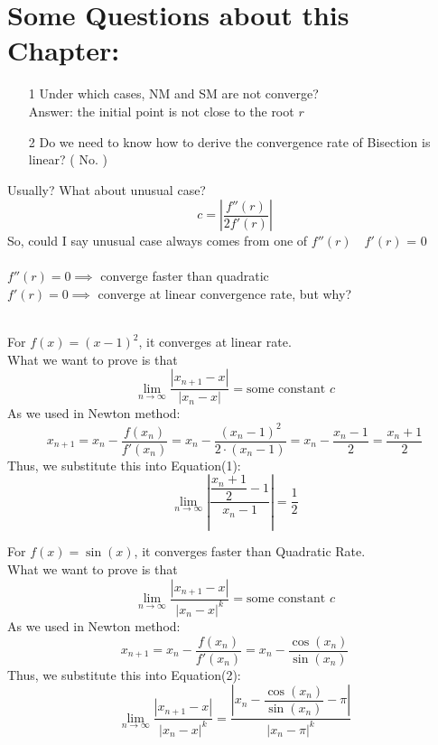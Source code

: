 \documentclass [9 pt]{article}
\theoremstyle{definition}
\begin{document}
\bigskip
\section*{Some Questions about this Chapter:}
\begin{itemize}
	\item[1] Under which cases, NM and SM are not converge?\\
	Answer: the initial point is not close to the root $r$
	\item[2] Do we need to know how to derive the convergence rate of Bisection is linear?
	(  No. )
\end{itemize}

\bigskip

 Usually? What about unusual case?
	$$c = |\dfrac{f''(r)}{2f'(r)}| $$
	So, could I say unusual case always comes from one of $f''(r) \quad f'(r)$ = 0\\
	\\
	$f''(r) = 0 \implies$ converge faster than quadratic\\
	$f'(r) = 0 \implies $ converge at linear convergence rate, but why?\\
	\\
	

\begin{mdframed}
	For $f(x) = (x - 1)^2$, it converges at linear rate.\\
	What we want to prove is that
	\begin{equation}
		\lim_{n \to \infty} \dfrac{|x_{n+1} - x|}{ |x_n - x|} = \text{some constant } c 
	\end{equation}
	As we used in Newton method:
	$$ x_{n+1} = x_n - \dfrac{f(x_n)}{f'(x_n)} = x_n - \dfrac{(x_n - 1)^2}{2\cdot (x_n - 1)}  = x_n - \dfrac{x_n - 1}{2} = \dfrac{x_n + 1}{2}$$
	Thus, we substitute this into Equation(1):
	$$ \lim_{n \to \infty} |\dfrac{\dfrac{x_n + 1}{2} - 1}{x_n - 1}| = \dfrac{1}{2} $$
\end{mdframed}

\newpage
\begin{mdframed}
	For $f(x) = \sin(x)$, it converges faster than Quadratic Rate.\\
		What we want to prove is that
	\begin{equation}
		\lim_{n \to \infty} \dfrac{|x_{n+1} - x|}{ |x_n - x|^ k} = \text{some constant } c 
	\end{equation}
	As we used in Newton method:
	$$ x_{n+1} = x_n - \dfrac{f(x_n)}{f'(x_n)} = x_n - \dfrac{\cos(x_n)}{\sin(x_n)} $$
	Thus, we substitute this into Equation(2):
	$$ \lim_{n \to \infty}\dfrac{|x_{n+1} - x|}{ |x_n - x|^ k} = \dfrac{|x_n - \dfrac{\cos(x_n)}{\sin(x_n)} - \pi|}{|x_n - \pi|^k}  $$
\end{mdframed}
\end{document}
